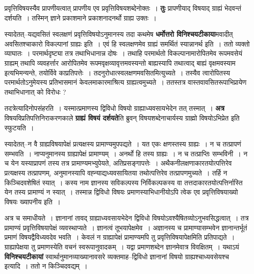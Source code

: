 \documentclass[article,12pt,a4paper]{memoir}
\begin{document}
	  \pstart प्रवृत्तिविषयस्यैव प्रापणीयत्वात् प्रापणीय एव प्रवृत्तिविषयशब्देनोक्तः । \textbf{तुः} प्रापणीयाद् विषयाद् ग्राह्यं भेदवन्तं दर्शयति । तस्मिन् ज्ञाने प्रकाशमाने प्रकाशनादनर्थो ग्राह्य उक्तः ।
	\pend
      

	  \pstart स्यादेतत्--यद्यवसितं स्वलक्षणं प्रवृत्तिविषयोऽनुमानस्य तदा कथमेष \textbf{धर्मोत्तरो विनिश्चयटीकाया}मवादीत् अवसितश्चाकारो विकल्पानां ग्राह्यः इति । एवं हि स्वलक्षणमेव ग्राह्यं समर्थितं स्यान्नानर्थ इति । ततो व्यक्तो व्याघातः । परमार्थदृष्ट्या तत्र तथाभिधानान्न दोषः । तथाहि परमार्थतो विकल्पानामारोपितमेव रूपमवसेयं ग्राह्यम् तथापि व्यवहर्त्तार आरोपितमेव रूपमवृक्षव्यावृत्तमवस्यन्तो बाह्यस्यापि तथात्वाद् बाह्यं वृक्षमवस्याम इत्यभिमन्यन्ते, तयोर्विवे  \leavevmode{} काप्रतिपत्तेः । तदनुरोधात्स्वलक्षणमवसितमित्युच्यते । तस्यैव त्वारोपितस्य परमार्थतोऽनुमेयस्य प्रतिभासमानं केवलमाकारमाश्रित्य ग्राह्यत्वमुच्यते । ततस्तत्र वास्तवावसितरूपाभिप्रायेण तथाभिधानात् को विरोधः ?
	\pend
      

	  \pstart तदत्रेत्यादिनोपसंहरति । यस्मात्प्रमाणस्य द्विविधो विषयो ग्राह्याध्यवसायभेदेन तत् तस्मात् । \textbf{अत्र} विषयविप्रतिपत्तिनिराकरणकाले \textbf{ग्राह्यं विषयं दर्शयते}ति ब्रुवन् विषयशब्देनाचार्यस्य ग्राह्मो विषयोऽभिप्रेत इति स्फुटयति ।
	\pend
      

	  \pstart स्यादेतत्--न वै ग्राह्यविषयापेक्षं प्रत्यक्षस्य प्रामाण्यमुपपद्यते । यत एकः क्षणस्तस्य ग्राह्यः । न च तत्प्रापणं सम्भवति । नाप्यनुमानस्य ग्राह्यापेक्षं प्रामाण्यम् । अनर्थो हि तस्य ग्राह्यः । न च तत्प्राप्तिः सम्भविनी । न च येन यस्याप्रापणं तस्य तत्र प्रामाण्यमभ्युपेयते, अतिप्रसङ्गापत्तेः । अथैकनीलक्षणाकारतयोत्पत्तिरेव प्रत्यक्षस्य तत्प्रापणम्, अनुमानस्यापि वह्न्याद्यध्यवसायितया तथोत्पत्तिरेव तत्प्रापणमुच्यते । तर्हि न किञ्चिदवशेषितं स्यात् । कस्य नाम ज्ञानस्य सविकल्पस्य निर्विकल्पकस्य वा तत्तदाकारतयोत्पत्तिर्नास्ति येन तस्य प्रामाण्यं न स्यात् । तस्मान्न द्विविधो विषयः प्रमाणस्याभिधानीयोऽपि त्वेक एव प्रवृत्तिविषयाख्यो विषयः ख्यापनीय इति ।
	\pend
      

	  \pstart अत्र च समाधीयते । ज्ञानानां तावद् ग्राह्याध्यवसायभेदेन द्विविधो विषयोऽवश्यैषितव्योऽनुभवसिद्धत्वात् । तत्र प्रामाण्यं प्रवृत्तिविषयापेक्षं व्यवस्थाप्यते । ज्ञानत्वं तूभयापेक्षमेव । अज्ञानस्य च प्रामाण्यासम्भवेन ज्ञानान्तर्भूतं प्रमाणं विषयद्वैविध्यवदेव भवति । केवलं न ग्राह्यापे\leavevmode{}क्षं प्रामाण्यमपि तु प्रवृत्तिविषयापेक्षमिति प्रतिपाद्यते । ग्राह्यापेक्षया तु प्रमाणस्येति वचनं स्वरूपानुवादकम् । यद्वा प्रमाणशब्देन ज्ञानमेवात्र विवक्षितम् । यथाऽयं \textbf{विनिश्चयटीकायां} स्वार्थानुमानव्याख्यानावसरे व्यक्तमाह--द्विविधो ज्ञानानां विषयो ग्राह्यश्चाध्यवसेयश्च इत्यादि । ततो न किञ्चिदवद्यम् ।
	\pend
      
\end{document}
